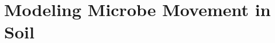 \documentclass[journal = bichaw, biochem=true]{achemso}
\begin{document}
    



    \section{Modeling Microbe Movement in Soil}\label{sec:modeling-microbe-movement-in-soil}

    
\end{document}
